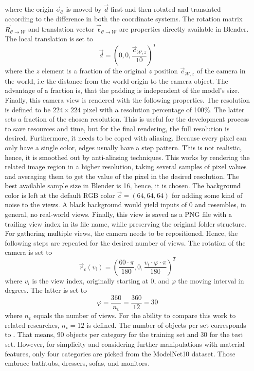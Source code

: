 where the origin $\vec{o}_{\mathcal{C}}$ is moved by $\vec{d}$ first and then rotated and translated according to the difference in both the coordinate systems.
The rotation matrix $\vec{R}_{\mathcal{C} \rightarrow \mathcal{W}}$ and translation vector $\vec{t}_{\mathcal{C} \rightarrow \mathcal{W}}$ are properties directly available in Blender.
The local translation is set to
\begin{equation}
	\vec{d} = \left( 0, 0, \frac{\vec{c}_{\mathcal{W}, z}}{10} \right)^T
\end{equation}
where the $z$ element is a fraction of the original $z$ position $\vec{c}_{\mathcal{W}, z}$ of the camera in the world, i.e the distance from the world origin to the camera object.
The advantage of a fraction is, that the padding is independent of the model's size.
Finally, this camera view is rendered with the following properties.
The resolution is defined to be $224 \times 224$ pixel with a resolution percentage of 100\%.
The latter sets a fraction of the chosen resolution.
This is useful for the development process to save resources and time, but for the final rendering, the full resolution is desired.
Furthermore, it needs to be coped with aliasing.
Because every pixel can only have a single color, edges usually have a step pattern.
This is not realistic, hence, it is smoothed out by anti-aliasing techniques.
This works by rendering the related image region in a higher resolution, taking several samples of pixel values and averaging them to get the value of the pixel in the desired resolution.
The best available sample size in Blender is 16, hence, it is chosen.
The background color is left at the default RGB color $\vec{c} = (64, 64, 64)$ for adding some kind of noise to the views.
A black background would yield inputs of 0 and resembles, in general, no real-world views.
Finally, this view is saved as a PNG file with a trailing view index in its file name, while preserving the original folder structure.
For gathering multiple views, the camera needs to be repositioned.
Hence, the following steps are repeated for the desired number of views.
The rotation of the camera is set to
\begin{equation}
	\vec{r}_c(v_i) = \left(  \frac{60 \cdot \pi}{180}, 0, \frac{v_i \cdot \varphi \cdot \pi}{180} \right)^T
\end{equation}
where $v_i$ is the view index, originally starting at 0, and $\varphi$ the moving interval in degrees.
The latter is set to
\begin{equation}
	\varphi = \frac{360}{n_v} = \frac{360}{12} = 30
\end{equation}
where $n_v$ equals the number of views.
For the ability to compare this work to related researches, $n_v = 12$ is defined.
The number of objects per set corresponds to \cite{Su:2015:MCN:2919332.2919750}.
That means, 90 objects per category for the training set and 30 for the test set.
However, for simplicity and considering further manipulations with material features, only four categories are picked from the ModelNet10 dataset.
Those embrace bathtubs, dressers, sofas, and monitors.
